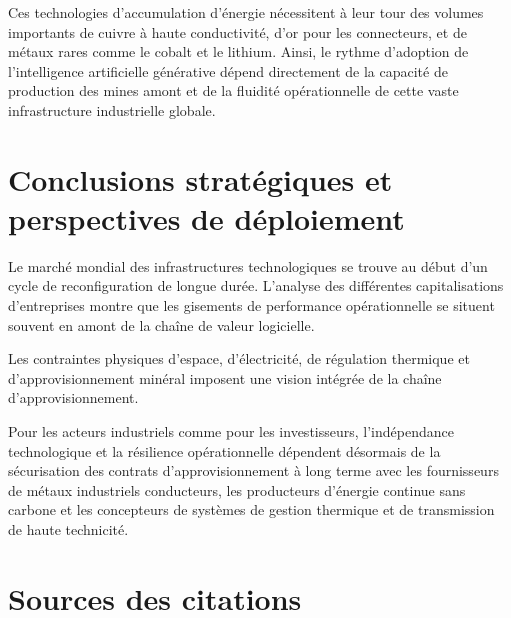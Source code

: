 \documentclass[11pt,a4paper]{article}
\begin{document}
Ces technologies d'accumulation d'énergie nécessitent à leur tour des volumes importants de cuivre à haute conductivité, d'or pour les connecteurs, et de métaux rares comme le cobalt et le lithium. Ainsi, le rythme d'adoption de l'intelligence artificielle générative dépend directement de la capacité de production des mines amont et de la fluidité opérationnelle de cette vaste infrastructure industrielle globale.

\section*{Conclusions stratégiques et perspectives de déploiement}

Le marché mondial des infrastructures technologiques se trouve au début d'un cycle de reconfiguration de longue durée. L'analyse des différentes capitalisations d'entreprises montre que les gisements de performance opérationnelle se situent souvent en amont de la chaîne de valeur logicielle.

Les contraintes physiques d'espace, d'électricité, de régulation thermique et d'approvisionnement minéral imposent une vision intégrée de la chaîne d'approvisionnement.

Pour les acteurs industriels comme pour les investisseurs, l'indépendance technologique et la résilience opérationnelle dépendent désormais de la sécurisation des contrats d'approvisionnement à long terme avec les fournisseurs de métaux industriels conducteurs, les producteurs d'énergie continue sans carbone et les concepteurs de systèmes de gestion thermique et de transmission de haute technicité.

\section*{Sources des citations}
\end{document}
